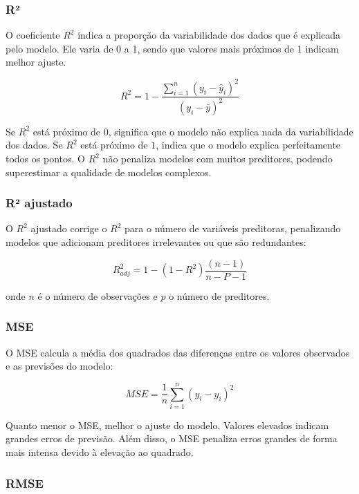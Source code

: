 \documentclass{article}
\begin{document}
\subsubsection{R²}

O coeficiente $R^2$ indica a proporção da variabilidade dos dados que é explicada 
pelo modelo. Ele varia de 0 a 1, sendo que valores mais próximos de 1 indicam 
melhor ajuste.

\begin{equation}
    R^2 = 1 - \frac{\displaystyle \sum_{i = 1}^{n}(y_i - \hat{y}_i)^2}{\displaystyle (y_i - \bar{y})^2}
\end{equation}

Se $R^2$ está próximo de $0$, significa que o modelo não explica nada da variabilidade
dos dados. Se $R^2$ está próximo de $1$, indica que o modelo explica perfeitamente todos
os pontos. O $R^2$ não penaliza modelos com muitos preditores, podendo superestimar a
qualidade de modelos complexos.

\subsubsection{R² ajustado}

O $R^2$ ajustado corrige o $R^2$ para o número de variáveis preditoras, penalizando
modelos que adicionam preditores irrelevantes ou que são redundantes:

\begin{equation}
    R^2_{adj} = 1 - (1 -R^2)\frac{(n - 1)}{n - P - 1}
\end{equation}

onde $n$ é o número de observações e $p$ o número de preditores.

\subsubsection{MSE}

O MSE calcula a média dos quadrados das diferenças entre os valores observados
e as previsões do modelo:

\begin{equation}
    MSE = \frac{1}{n}\sum_{i = 1}^{n}(y_i - \hat{y}_i)^2
\end{equation}  

Quanto menor o MSE, melhor o ajuste do modelo. Valores elevados indicam grandes
erros de previsão. Além disso, o MSE penaliza erros grandes de forma mais intensa
devido à elevação ao quadrado.

\subsubsection{RMSE}
\end{document}
